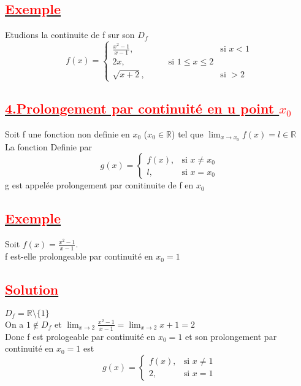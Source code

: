 \documentclass[12pt]{article}
\begin{document}
\subsection*{\underline{\textbf{\textcolor{red}{Exemple}}}}
Etudions la continuite de f sur son $D_{f}$\\
\[ f(x) = \begin{cases} 
  \frac{x^2-1}{x-1}, & \text{si } x < 1 \\
   2x,\quad\quad\quad\quad\quad \text{si } 1 \leq x \leq 2\\
  \sqrt{x+2}, & \text{si } > 2
\end{cases} \]
\subsection*{\underline{\textbf{\textcolor{red}{4.Prolongement par continuité en u point $x_{0}$}}}}
Soit f une fonction non definie en $x_{0}$ ($x_{0} \in \mathbb{R}$) tel que $\lim_{x \to x_{0}}f(x)=l \in \mathbb{R}$\\
La fonction Definie par 
\[ g(x) = \begin{cases} 
  f(x), & \text{si } x \neq x_{0} \\
  l, & \text{si } x= x_{0}
\end{cases} \]
g est appelée prolongement par conitinuite de f en $ x_{0} $
\subsection*{\underline{\textbf{\textcolor{red}{Exemple}}}}
Soit $f(x)=\frac{x^{2}-1}{x-1}$.\\
f est-elle prolongeable par continuité en $ x_{0}=1$
\subsection*{\underline{\textbf{\textcolor{red}{Solution}}}}
$D_{f}=\mathbb{R}\setminus\{1\}$\\
On a $1 \notin D_{f}$ et $\lim_{x \to 2}\frac{x^{2}-1}{x-1}=\lim_{x \to 2} x+1=2$\\
Donc f est prologeable par continuité en $x_{0}=1$ et son prolongement par continuité en $x_{0}=1$ est 
\[ g(x) = \begin{cases} 
  f(x), & \text{si } x \neq 1 \\
  2, & \text{si } x= 1
\end{cases} \]
\subsection*{\underline{\textbf{\textcolor{red}{}}}}
\end{document}
